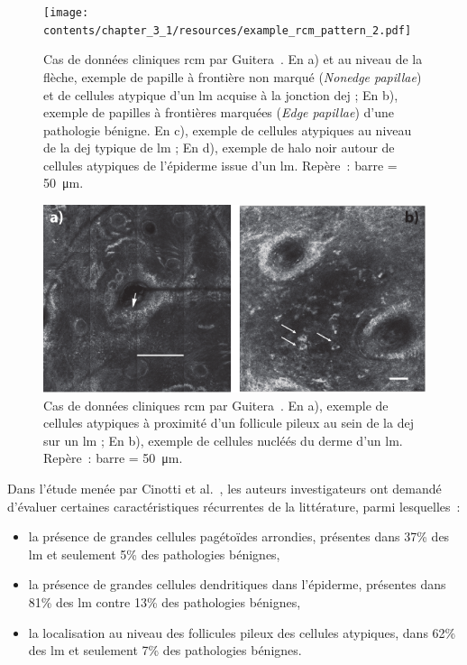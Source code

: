 \begin{figure}[H]
    \begin{center}
        \texttt{[image: contents/chapter\_3\_1/resources/example\_rcm\_pattern\_2.pdf]}
        \caption{Cas de données cliniques \gls{rcm} par Guitera~\cite{Guitera2010}. En a) et au niveau de la flèche, exemple de papille à frontière non marqué (\textit{Nonedge papillae}) et de cellules atypique d'un \gls{lm} acquise à la jonction \gls{dej} ; En b), exemple de papilles à frontières marquées (\textit{Edge papillae}) d'une pathologie bénigne. En c), exemple de cellules atypiques au niveau de la \gls{dej} typique de \gls{lm} ; En d), exemple de halo noir autour de cellules atypiques de l'épiderme issue d'un \gls{lm}. Repère~: barre = \SI{50}{\micro\metre}.}
        \label{fig:example_rcm_pattern_2}
    \end{center} 
\end{figure}\par

\begin{figure}[H]
    \begin{center}
        \includegraphics[width=0.8 \linewidth]{contents/chapter_3_1/resources/example_rcm_pattern_3.pdf}
        \caption{Cas de données cliniques \gls{rcm} par Guitera~\cite{Guitera2010}. En a), exemple de cellules atypiques à proximité d'un follicule pileux au sein de la \gls{dej} sur un \gls{lm} ; En b), exemple de cellules nucléés du derme d'un \gls{lm}. Repère~: barre = \SI{50}{\micro\metre}.}
        \label{fig:example_rcm_pattern_3}
    \end{center} 
\end{figure}\par

Dans l'étude menée par Cinotti et al.~\cite{Cinotti2018}, les auteurs investigateurs ont demandé d'évaluer certaines caractéristiques récurrentes de la littérature, parmi lesquelles~:
\begin{itemize}
    \item la présence de grandes cellules pagétoïdes arrondies, présentes dans 37\% des \gls{lm} et seulement 5\% des pathologies bénignes,
    \item la présence de grandes cellules dendritiques dans l'épiderme, présentes dans 81\% des \gls{lm} contre 13\% des pathologies bénignes,
    \item la localisation au niveau des follicules pileux des cellules atypiques, dans 62\% des \gls{lm} et seulement 7\% des pathologies bénignes.
\end{itemize}\par


